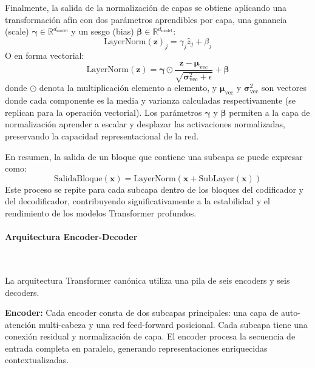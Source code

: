 Finalmente, la salida de la normalización de capas se obtiene aplicando una transformación afín con dos parámetros aprendibles por capa, una ganancia (scale) $\boldsymbol{\gamma} \in \mathbb{R}^{d_{\text{model}}}$ y un sesgo (bias) $\boldsymbol{\beta} \in \mathbb{R}^{d_{\text{model}}}$:
\begin{equation}
\text{LayerNorm}(\mathbf{z})_j = \gamma_j \hat{z}_j + \beta_j
\label{eq:ln_final_output_j}
\end{equation}
O en forma vectorial:
\begin{equation}
\text{LayerNorm}(\mathbf{z}) = \boldsymbol{\gamma} \odot \frac{\mathbf{z} - \boldsymbol{\mu}_{\text{vec}}}{\sqrt{\boldsymbol{\sigma}^2_{\text{vec}} + \epsilon}} + \boldsymbol{\beta}
\label{eq:ln_final_output_vector}
\end{equation}
donde $\odot$ denota la multiplicación elemento a elemento, y $\boldsymbol{\mu}_{\text{vec}}$ y $\boldsymbol{\sigma}^2_{\text{vec}}$ son vectores donde cada componente es la media y varianza calculadas respectivamente (se replican para la operación vectorial). Los parámetros $\boldsymbol{\gamma}$ y $\boldsymbol{\beta}$ permiten a la capa de normalización aprender a escalar y desplazar las activaciones normalizadas, preservando la capacidad representacional de la red.

En resumen, la salida de un bloque que contiene una subcapa se puede expresar como:
\begin{equation}
\text{SalidaBloque}(\mathbf{x}) = \text{LayerNorm}(\mathbf{x} + \text{SubLayer}(\mathbf{x}))
\label{eq:block_output}
\end{equation}
Este proceso se repite para cada subcapa dentro de los bloques del codificador y del decodificador, contribuyendo significativamente a la estabilidad y el rendimiento de los modelos Transformer profundos.

\paragraph{Arquitectura Encoder-Decoder} \

La arquitectura Transformer canónica utiliza una pila de seis encoders y seis decoders.

\textbf{Encoder:} Cada encoder consta de dos subcapas principales: una capa de auto-atención multi-cabeza y una red feed-forward posicional. Cada subcapa tiene una conexión residual y normalización de capa. El encoder procesa la secuencia de entrada completa en paralelo, generando representaciones enriquecidas contextualizadas.

